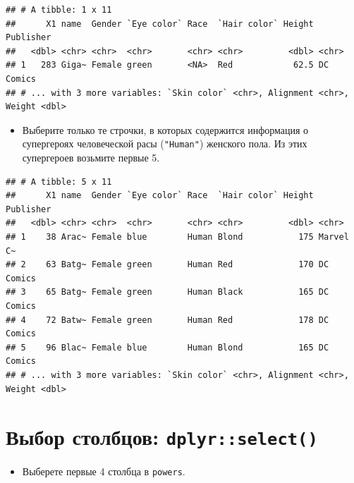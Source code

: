 \documentclass[]{book}
\newenvironment{Shaded}{\begin{snugshade}}{\end{snugshade}}
\newcommand{\KeywordTok}[1]{\textcolor[rgb]{0.13,0.29,0.53}{\textbf{#1}}}
\newcommand{\DecValTok}[1]{\textcolor[rgb]{0.00,0.00,0.81}{#1}}
\newcommand{\StringTok}[1]{\textcolor[rgb]{0.31,0.60,0.02}{#1}}
\newcommand{\OperatorTok}[1]{\textcolor[rgb]{0.81,0.36,0.00}{\textbf{#1}}}
\newcommand{\NormalTok}[1]{#1}
\providecommand{\tightlist}{%
  \setlength{\itemsep}{0pt}\setlength{\parskip}{0pt}}
\begin{document}
\begin{verbatim}
## # A tibble: 1 x 11
##      X1 name  Gender `Eye color` Race  `Hair color` Height Publisher
##   <dbl> <chr> <chr>  <chr>       <chr> <chr>         <dbl> <chr>    
## 1   283 Giga~ Female green       <NA>  Red            62.5 DC Comics
## # ... with 3 more variables: `Skin color` <chr>, Alignment <chr>, Weight <dbl>
\end{verbatim}

\begin{itemize}
\tightlist
\item
  Выберите только те строчки, в которых содержится информация о
  супергероях человеческой расы (\texttt{"Human"}) женского пола. Из
  этих супергероев возьмите первые 5.
\end{itemize}

\begin{Shaded}
\end{Shaded}

\begin{verbatim}
## # A tibble: 5 x 11
##      X1 name  Gender `Eye color` Race  `Hair color` Height Publisher
##   <dbl> <chr> <chr>  <chr>       <chr> <chr>         <dbl> <chr>    
## 1    38 Arac~ Female blue        Human Blond           175 Marvel C~
## 2    63 Batg~ Female green       Human Red             170 DC Comics
## 3    65 Batg~ Female green       Human Black           165 DC Comics
## 4    72 Batw~ Female green       Human Red             178 DC Comics
## 5    96 Blac~ Female blue        Human Blond           165 DC Comics
## # ... with 3 more variables: `Skin color` <chr>, Alignment <chr>, Weight <dbl>
\end{verbatim}

\section{\texorpdfstring{Выбор столбцов:
\texttt{dplyr::select()}}{Выбор столбцов: dplyr::select()}}\label{solution_select}

\begin{itemize}
\tightlist
\item
  Выберете первые 4 столбца в \texttt{powers}.
\end{itemize}
\end{document}

